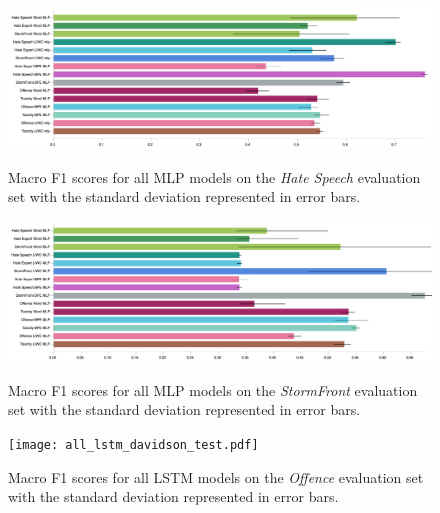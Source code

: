 \begin{figure}
\begin{minipage}{\textwidth}
\centering
  \includegraphics[width=\textwidth]{all_mlp_waseem_hovy_test.pdf}
  \caption{Macro F1 scores for all MLP models on the \textit{Hate Speech} evaluation set with the standard deviation represented in error bars.}
  \label{fig:waseem_hovy_mlp_test}
\vfill
  \includegraphics[width=\textwidth]{all_mlp_garcia_test.pdf}
  \caption{Macro F1 scores for all MLP models on the \textit{StormFront} evaluation set with the standard deviation represented in error bars.}
  \label{fig:garcia_mlp_test}
  \vfill
    \texttt{[image: all\_lstm\_davidson\_test.pdf]}
    \caption{Macro F1 scores for all LSTM models on the \textit{Offence} evaluation set with the standard deviation represented in error bars.}
    \label{fig:davidson_lstm_test}
  \end{minipage}
\end{figure}

